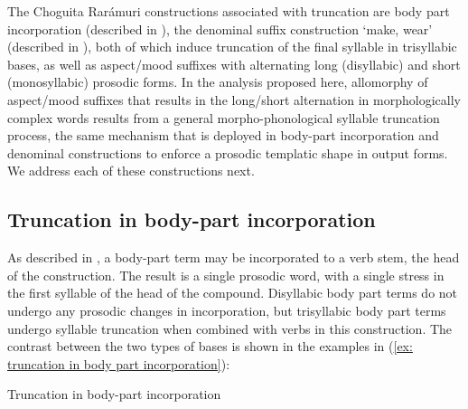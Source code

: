 The Choguita Rarámuri constructions associated with truncation are body part incorporation (described in ), the denominal suffix construction `make, wear' (described in ), both of which induce truncation of the final syllable in trisyllabic bases, as well as aspect/mood suffixes with alternating long (disyllabic) and short (monosyllabic) prosodic forms. In the analysis proposed here, allomorphy of aspect/mood suffixes that results in the long/short alternation in morphologically complex words results from a general morpho-phonological syllable truncation process, the same mechanism that is deployed in body-part incorporation and denominal constructions to enforce a prosodic templatic shape in output forms. We address each of these constructions next.

\subsection{Truncation in body-part incorporation}
\label{subsec: truncation in body-part incorporation}

As described in , a body-part term may be incorporated to a verb stem, the head of the construction. The result is a single prosodic word, with a single stress in the first syllable of the head of the compound. Disyllabic body part terms do not undergo any prosodic changes in incorporation, but trisyllabic body part terms undergo syllable truncation when combined with verbs in this construction. The contrast between the two types of bases is shown in the examples in (\ref{ex: truncation in body part incorporation}):

\ea\label{ex: truncation in body part incorporation}
{Truncation in body-part incorporation}

    \z
\z

